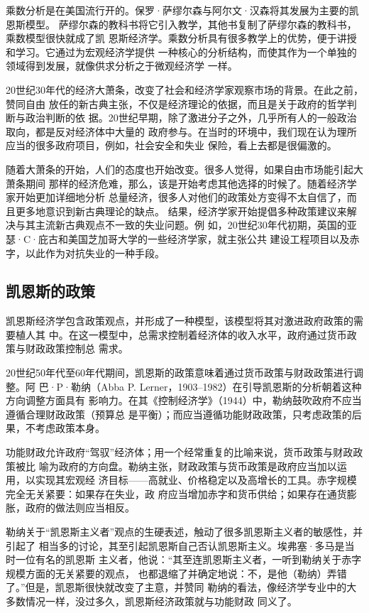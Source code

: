 乘数分析是在美国流行开的。保罗·萨缪尔森与阿尔文·汉森将其发展为主要的凯恩斯模型。
萨缪尔森的教科书将它引入教学，其他书复制了萨缪尔森的教科书，乘数模型很快就成了凯
恩斯经济学。乘数分析具有很多教学上的优势，便于讲授和学习。它通过为宏观经济学提供
一种核心的分析结构，而使其作为一个单独的领域得到发展，就像供求分析之于微观经济学
一样。

20世纪30年代的经济大萧条，改变了社会和经济学家观察市场的背景。在此之前，赞同自由
放任的新古典主张，不仅是经济理论的依据，而且是关于政府的哲学判断与政治判断的依
据。20世纪早期，除了激进分子之外，几乎所有人的一般政治取向，都是反对经济体中大量的
政府参与。在当时的环境中，我们现在认为理所应当的很多政府项目，例如，社会安全和失业
保险，看上去都是很偏激的。

随着大萧条的开始，人们的态度也开始改变。很多人觉得，如果自由市场能引起大萧条期间
那样的经济危难，那么，该是开始考虑其他选择的时候了。随着经济学家开始更加详细地分析
总量经济，很多人对他们的政策处方变得不太自信了，而且更多地意识到新古典理论的缺点。
结果，经济学家开始提倡多种政策建议来解决与其主流新古典观点不一致的失业问题。例
如，20世纪30年代初期，英国的亚瑟·C·庇古和美国芝加哥大学的一些经济学家，就主张公共
建设工程项目以及赤字，以此作为对抗失业的一种手段。

\subsection{凯恩斯的政策}

凯恩斯经济学包含政策观点，并形成了一种模型，该模型将其对激进政府政策的需要植人其
中。在这一模型中，总需求控制着经济体的收入水平，政府通过货币政策与财政政策控制总
需求。

20世纪50年代至60年代期间，凯恩斯的政策意味着通过货币政策与财政政策进行调整。阿
巴·P·勒纳（Abba P. Lerner，1903--1982）在引导凯恩斯的分析朝着这种方向调整方面具有
影响力。在其《控制经济学》（1944）中，勒纳鼓吹政府不应当遵循合理财政政策（预算总
是平衡）；而应当遵循功能财政政策，只考虑政策的后果，不考虑政策本身。

功能财政允许政府“驾驭”经济体；用一个经常重复的比喻来说，货币政策与财政政策被比
喻为政府的方向盘。勒纳主张，财政政策与货币政策是政府应当加以运用，以实现其宏观经
济目标——高就业、价格稳定以及高增长的工具。赤字规模完全无关紧要：如果存在失业，政
府应当增加赤字和货币供给；如果存在通货膨胀，政府的做法则应当相反。

勒纳关于“凯恩斯主义者”观点的生硬表述，触动了很多凯恩斯主义者的敏感性，并引起了
相当多的讨论，其至引起凯恩斯自己否认凯恩斯主义。埃弗塞·多马是当时一位有名的凯恩斯
主义者，他说：“其至连凯恩斯主义者，一听到勒纳关于赤字规模方面的无关紧要的观点，
也都退缩了并确定地说：不，是他（勒纳）弄错了。”但是，凯恩斯很快就改变了主意，并赞同
勒纳的看法，像经济学专业中的大多数情况一样，没过多久，凯恩斯经济政策就与功能财政
同义了。

